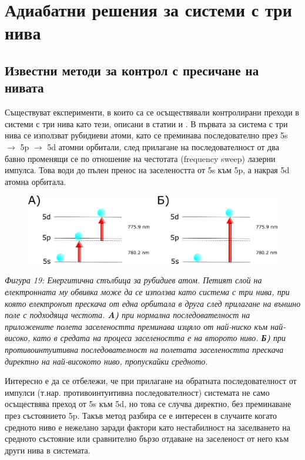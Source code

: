    \chapter{Адиабатни решения за системи с три нива}

    \section{Известни методи за контрол с пресичане на нивата}

    Съществуват експерименти, в които са се осъществявали контролирани преходи в системи с три нива като тези, описани в статии \cite{broers1992efficient} и \cite{melinger1992generation}.
    В първата за система с три нива се използват рубидиеви атоми, като се преминава последователно през 5s $\rightarrow$ 5p $\rightarrow$ 5d атомни орбитали,
    след прилагане на последователност от два бавно променящи се по отношение на честотата (frequency sweep) лазерни импулса. Това води до пълен пренос на заселеността
    от 5s към 5p, а накрая 5d атомна орбитала. 

    \begin{figure}[H]
        \centering
        \includegraphics[width=430pt]{3-Level.png}
    \end{figure}
    \begin{center}
        \small \textit{Фигура 19: Енергитична стълбица за рубидиев атом. Петият слой на електронната му обвивка може да се използва като система с три нива,
        при която електронът прескача от една орбитала в друга след прилагане на външно поле с подходяща честота. \textbf{A)} при нормална последователност
        на приложените полета заселеността преминава изцяло от най-ниско към най-високо, като в средата на процеса заселеността е на второто ниво.
        \textbf{Б)} при противоинтуитивна последователност на полетата заселеността прескача директно на най-високото ниво, пропускайки средното.}\\
    \end{center}

    Интересно е да се отбележи, че при прилагане на обратната последователност от импулси (т.нар. противоинтуитивна последователност)
    системата не само осъществява преход от 5s към 5d, но това се случва директно, без преминаване през състоянието 5p. Такъв метод разбира се е интересен в случаите когато
    средното ниво е нежелано заради фактори като нестабилност на заселването на средното състояние или сравнително бързо отдаване на заселеност от него към други нива в системата.

